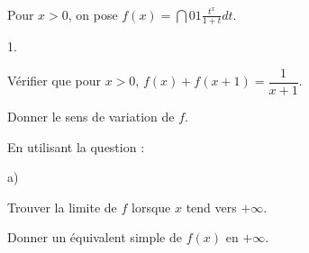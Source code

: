 \documentclass[11pt]{article}%
\begin{document}
\newpage


\begin{exercice}~\\
  Pour $x>0$, on pose ${f(x)=\dint{0}{1} \frac{t^x}{1+t}dt}$.
  \begin{noliste}{1.}
  \item Vérifier que pour $x>0$, ${f(x) + f(x+1) =
      \dfrac{1}{x+1}}$.
  \item Donner le sens de variation de $f$.
  \item En utilisant la question  :
    \begin{noliste}{a)}
    \item Trouver la limite de $f$ lorsque $x$ tend vers $+\infty$.
    \item Donner un équivalent simple de $f(x)$ en $ +\infty$.
    \end{noliste}
\end{noliste}
\end{exercice}
\end{document}
